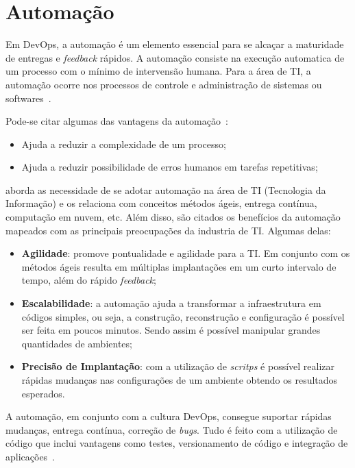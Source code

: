 \section{Automação}
\label{sec:auto}

Em DevOps, a automação é um elemento essencial para se alcaçar a maturidade
de entregas e \textit{feedback} rápidos. A automação consiste na execução
automatica de um processo com o mínimo de intervensão humana. Para a área
de TI, a automação ocorre nos processos de controle e administração de
sistemas ou softwares~\cite{sharma:2015}.

Pode-se citar algumas das vantagens da automação~\cite{sharma:2015}:
\begin{itemize}
  \item Ajuda a reduzir a complexidade de um processo;
  \item Ajuda a reduzir possibilidade de erros humanos em tarefas
    repetitivas;
\end{itemize}

 aborda as necessidade de se adotar automação na área
de TI (Tecnologia da Informação) e os relaciona com conceitos métodos
ágeis, entrega contínua, computação em nuvem, etc. Além disso, são citados %
os benefícios da automação mapeados com as principais preocupações da industria
de TI. Algumas delas:

\begin{itemize}
  \item \textbf{Agilidade}: promove pontualidade e agilidade para a TI. Em conjunto
    com os métodos ágeis resulta em múltiplas implantações em um curto intervalo
    de tempo, além do rápido \textit{feedback};
  \item \textbf{Escalabilidade}: a automação ajuda a transformar a infraestrutura
    em códigos simples, ou seja, a construção, reconstrução e configuração é possível
    ser feita em poucos minutos. Sendo assim é possível manipular grandes quantidades
    de ambientes;
  \item \textbf{Precisão de Implantação}: com a utilização de \textit{scritps}
    é possível realizar rápidas mudanças nas configurações de um ambiente
    obtendo os resultados esperados.
\end{itemize}

A automação, em conjunto com a cultura DevOps, consegue suportar rápidas mudanças,
entrega contínua, correção de \textit{bugs}. Tudo é feito com a utilização de
código que inclui vantagens como testes, versionamento de código e
integração de aplicações~.

